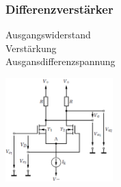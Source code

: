   \subsubsection{Differenzverst\"arker}
    \begin{minipage}[T]{14cm}
      Ausgangswiderstand
      \hspace{10.6mm}\\
      Verst\"arkung
      \hspace{23.3mm}\\
      Ausgansdifferenzspannung
      \hspace{1.7mm}
                
    \end{minipage}
    \begin{minipage}[T]{5cm}
      \includegraphics[height=4cm]{./bilder/MOSFET_Diffamp.png}
    \end{minipage}